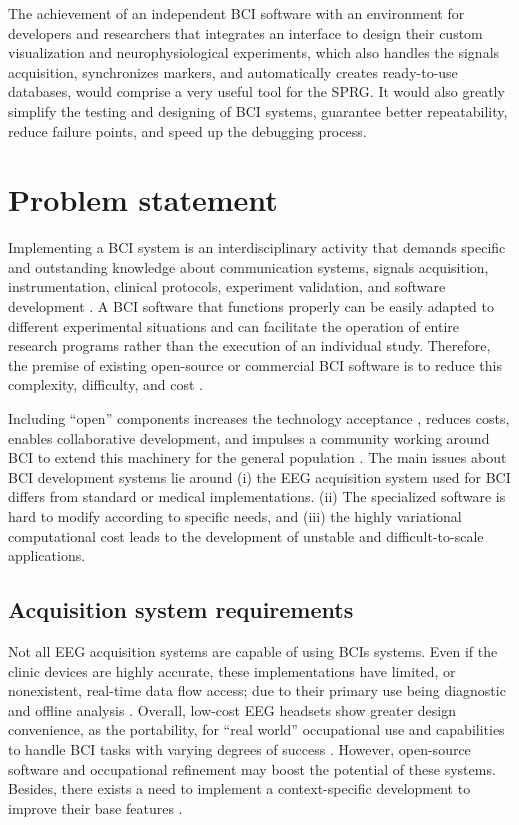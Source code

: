 The achievement of an independent \gls*{BCI} software with an environment for developers and researchers that integrates an interface to design their custom visualization and neurophysiological experiments, which also handles the signals acquisition, synchronizes markers, and automatically creates ready-to-use databases, would comprise a very useful tool for the \gls*{SPRG}. It would also greatly simplify the testing and designing of \gls*{BCI} systems, guarantee better repeatability, reduce failure points, and speed up the debugging process. 

\section{Problem statement}\label{sec:problem} 

Implementing a \gls*{BCI} system is an interdisciplinary activity that demands specific and outstanding knowledge about communication systems, signals acquisition, instrumentation, clinical protocols, experiment validation, and software development \cite{wolpaw2002brain}. A \gls*{BCI} software that functions properly can be easily adapted to different experimental situations and can facilitate the operation of entire research programs rather than the execution of an individual study. Therefore, the premise of existing open-source or commercial \gls*{BCI} software is to reduce this complexity, difficulty, and cost \cite{nam2018brain}.

Including “open” components increases the technology acceptance \cite{wessel2019switching}, reduces costs, enables collaborative development, and impulses a community working around \gls*{BCI} to extend this machinery for the general population \cite{wolpaw2012brain}. The main issues about \gls*{BCI} development systems lie around (i) the EEG acquisition system used for \gls*{BCI} differs from standard or medical implementations. (ii) The specialized software is hard to modify according to specific needs, and (iii) the highly variational computational cost leads to the development of unstable and difficult-to-scale applications.

\subsection{Acquisition system requirements}

 Not all \gls*{EEG} acquisition systems are capable of using \glspl*{BCI} systems. Even if the clinic devices are highly accurate, these implementations have limited, or nonexistent, real-time data flow access; due to their primary use being diagnostic and offline analysis \cite{ordikhani2018augmenting}. Overall, low-cost \gls*{EEG} headsets show greater design convenience, as the portability, for “real world” occupational use and capabilities to handle \gls*{BCI} tasks with varying degrees of success \cite{martinez2016low}. However, open-source software and occupational refinement may boost the potential of these systems. Besides, there exists a need to implement a context-specific development to improve their base features \cite{larocco2020systemic}.

